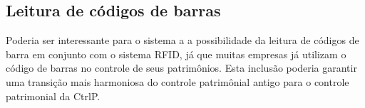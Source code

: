 \documentclass[
	12pt,				%
	openright,			%
	oneside,			%
	a4paper,			%
	english,			%
	french,				%
	spanish,			%
	brazil				%
	]{abntex2}
\begin{document}
\subsection{Leitura de códigos de barras}

Poderia ser interessante para o sistema a a possibilidade da leitura de códigos de barra em conjunto com o sistema RFID, já que muitas empresas já utilizam o código de barras no controle de seus patrimônios. Esta inclusão poderia garantir uma transição mais harmoniosa do controle patrimônial antigo para o controle patrimonial da CtrlP.






\end{document}
